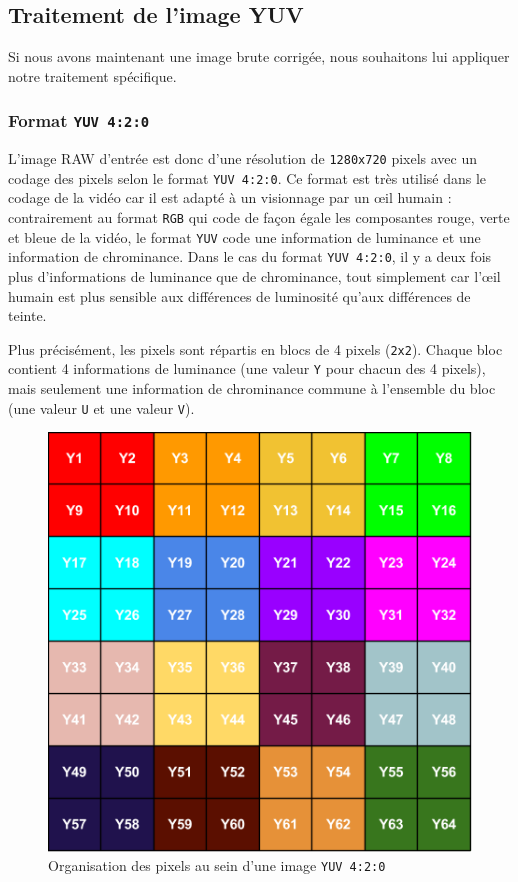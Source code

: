 \documentclass[11pt,a4paper]{article}
\begin{document}
\subsection{Traitement de l'image YUV}
Si nous avons maintenant une image brute corrigée, nous souhaitons lui appliquer notre traitement spécifique.

\subsubsection{Format \texttt{YUV 4:2:0}}
L'image RAW d'entrée est donc d'une résolution de \texttt{1280x720} pixels avec un codage des pixels selon le format \texttt{YUV 4:2:0}.
Ce format est très utilisé dans le codage de la vidéo car il est adapté à un visionnage par un œil humain : contrairement au format \texttt{RGB} qui code de façon égale les composantes rouge, verte et bleue de la vidéo, le format \texttt{YUV} code une information de luminance et une information de chrominance.
Dans le cas du format \texttt{YUV 4:2:0}, il y a deux fois plus d'informations de luminance que de chrominance, tout simplement car l'œil humain est plus sensible aux différences de luminosité qu'aux différences de teinte.

\bigbreak
Plus précisément, les pixels sont répartis en blocs de 4 pixels (\texttt{2x2}).
Chaque bloc contient 4 informations de luminance (une valeur \texttt{Y} pour chacun des 4 pixels), mais seulement une information de chrominance commune à l'ensemble du bloc (une valeur \texttt{U} et une valeur \texttt{V}).

\begin{figure}[H]
\begin{center}
\includegraphics[scale=0.5]{images/yuv1.png}
\end{center}
\caption{Organisation des pixels au sein d'une image \texttt{YUV 4:2:0}}
\label{}
\end{figure}
\end{document}
